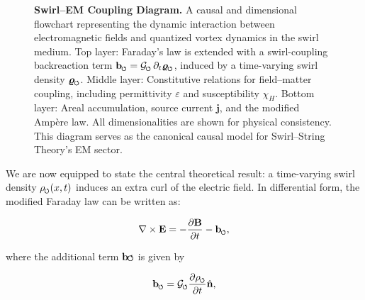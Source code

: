\documentclass[12pt]{article}
\DeclareRobustCommand{\swirlarrow}{
\mathchoice{\mkern-2mu\scriptstyle\boldsymbol{\circlearrowleft}}%
{\mkern-2mu\scriptstyle\boldsymbol{\circlearrowleft}}%
{\mkern-2mu\scriptscriptstyle\boldsymbol{\circlearrowleft}}%
{\mkern-2mu\scriptscriptstyle\boldsymbol{\circlearrowleft}}
}%
\begin{document}
\begin{figure}[htbp]
{\begin{tikzpicture}
        \end{tikzpicture}
        }
        \caption{\textbf{Swirl–EM Coupling Diagram.}
        A causal and dimensional flowchart representing the dynamic interaction between electromagnetic fields and quantized vortex dynamics in the swirl medium.
        Top layer: Faraday’s law is extended with a swirl-coupling backreaction term \( \mathbf{b}_{\swirlarrow} = \mathcal{G}_{\swirlarrow} \, \partial_t \bm{\varrho}_{\swirlarrow} \), induced by a time-varying swirl density \( \bm{\varrho}_{\swirlarrow} \).
        Middle layer: Constitutive relations for field–matter coupling, including permittivity \( \varepsilon \) and susceptibility \( \chi_H \).
        Bottom layer: Areal accumulation, source current \( \mathbf{j} \), and the modified Ampère law.
        All dimensionalities are shown for physical consistency. This diagram serves as the canonical causal model for Swirl–String Theory's EM sector.}
        \label{fig:swirl_em_causal}
    \end{figure}

We are now equipped to state the central theoretical result: a time-varying swirl density $\rho_{\swirlarrow}(x,t)$ induces an extra curl of the electric field. In differential form, the modified Faraday law can be written as:

\begin{equation}\label{eq:faraday-mod}

\nabla \times \mathbf{E} = -\frac{\partial \mathbf{B}}{\partial t} - \mathbf{b}_{\swirlarrow},
\end{equation}

where the additional term $\mathbf{b}{\swirlarrow}$ is given by

\begin{equation}\label{eq:b_swirl}

\mathbf{b}_{\swirlarrow} = \mathcal{G}_{\swirlarrow} \frac{\partial \rho_{\swirlarrow}}{\partial t} \hat{\mathbf{n}},
\end{equation}
\end{document}
